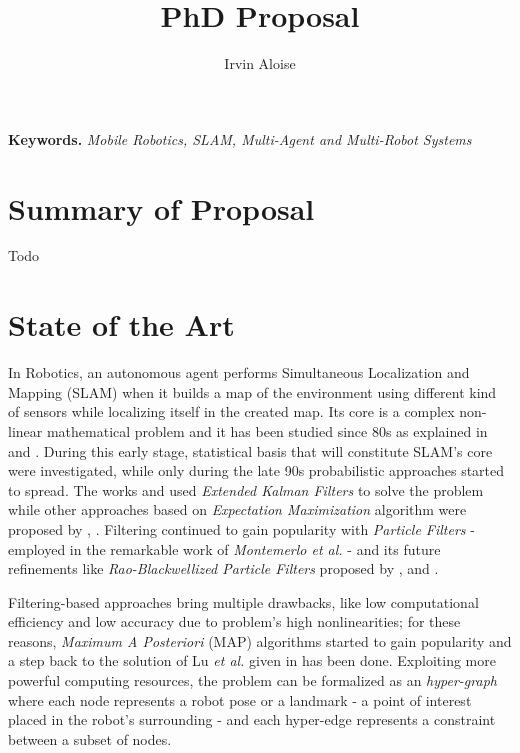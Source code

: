 \documentclass[10pt,a4paper, notitlepage]{report}
\title{PhD Proposal}
\author{Irvin Aloise}
\begin{document}
\maketitle


\textbf{Keywords.} \textit{Mobile Robotics, SLAM, Multi-Agent and Multi-Robot Systems}


\section*{Summary of Proposal}
Todo


\section*{State of the Art}
In Robotics, an autonomous agent performs Simultaneous Localization and Mapping (SLAM) when it builds a map of the environment using different kind of sensors while localizing itself in the created map. Its core is a complex non-linear mathematical problem and it has been studied since 80s as explained in \cite{durrant2006simultaneous} and \cite{bailey2006simultaneous}. During this early stage, statistical basis that will constitute SLAM's core were investigated, while only during the late 90s probabilistic approaches started to spread. The works \cite{leonard1990dynamic} and \cite{dissanayake2001solution} used \textit{Extended Kalman Filters} to solve the problem while other approaches based on \textit{Expectation Maximization} algorithm were proposed by \cite{dellaert2003mcmc}, \cite{thrun2001probabilistic}. Filtering continued to gain popularity with \textit{Particle Filters} - employed in the remarkable work of \textit{Montemerlo et al.} \cite{montemerlo2002fastslam} - and its future refinements like \textit{Rao-Blackwellized Particle Filters} proposed by \cite{grisetti2005improving}, \cite{carlone2010rao} and \cite{tipaldi2007heterogeneous}.

Filtering-based approaches bring multiple drawbacks, like low computational efficiency and low accuracy due to problem's high nonlinearities; for these reasons, \textit{Maximum A Posteriori} (MAP) algorithms started to gain popularity and a step back to the solution of Lu \textit{et al.} given in \cite{lu1997globally} has been done. Exploiting more powerful computing resources, the problem can be formalized as an \textit{hyper-graph} where each node represents a robot pose or a landmark - a point of interest placed in the robot's surrounding - and each hyper-edge represents a constraint between a subset of nodes. 
\end{document}
